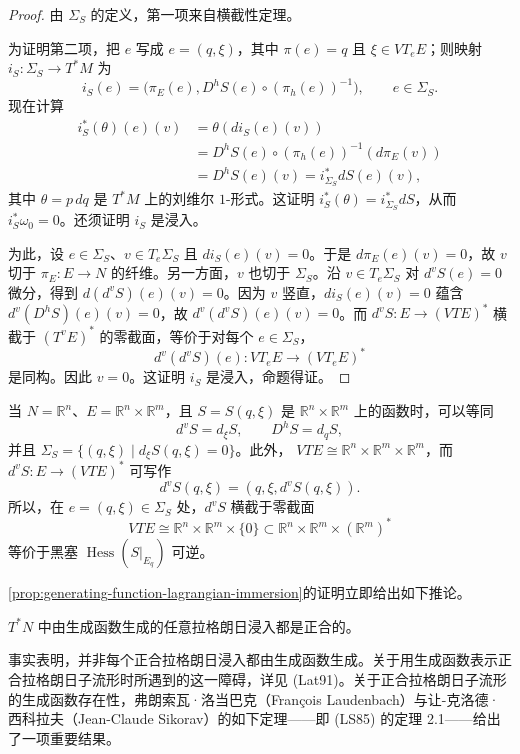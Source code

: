 \begin{proof}
由 $\Sigma_S$ 的定义，第一项来自横截性定理。

为证明第二项，把 $e$ 写成 $e=(q,\xi)$，其中 $\pi(e)=q$ 且
$\xi\in VT_eE$；则映射 $i_S:\Sigma_S\to T^*M$ 为
\[
 i_S(e)=\bigl(\pi_E(e),D^hS(e)\circ(\pi_h(e))^{-1}\bigr),
 \qquad e\in\Sigma_S.
\]
现在计算
\[
\begin{aligned}
 i_S^*(\theta)(e)(v)
 &=\theta(di_S(e)(v))\\
 &=D^hS(e)\circ(\pi_h(e))^{-1}(d\pi_E(v))\\
 &=D^hS(e)(v)=i_{\Sigma_S}^*dS(e)(v),
\end{aligned}
\]
其中 $\theta=p\,dq$ 是 $T^*M$ 上的刘维尔 $1$-形式。这证明
$i_S^*(\theta)=i_{\Sigma_S}^*dS$，从而 $i_S^*\omega_0=0$。还须证明 $i_S$ 是浸入。

为此，设 $e\in\Sigma_S$、$v\in T_e\Sigma_S$ 且 $di_S(e)(v)=0$。于是
$d\pi_E(e)(v)=0$，故 $v$ 切于 $\pi_E:E\to N$ 的纤维。另一方面，$v$ 也切于
$\Sigma_S$。沿 $v\in T_e\Sigma_S$ 对 $d^vS(e)=0$ 微分，得到
$d(d^vS)(e)(v)=0$。因为 $v$ 竖直，$di_S(e)(v)=0$ 蕴含
$d^v(D^hS)(e)(v)=0$，故 $d^v(d^vS)(e)(v)=0$。而
$d^vS:E\to(VTE)^*$ 横截于 $(T^vE)^*$ 的零截面，等价于对每个
$e\in\Sigma_S$，
\[
 d^v(d^vS)(e):VT_eE\longrightarrow(VT_eE)^*
\]
是同构。因此 $v=0$。这证明 $i_S$ 是浸入，命题得证。
\end{proof}

\begin{remark}\label{rem:generating-function-euclidean-case}
当 $N=\mathbb R^n$、$E=\mathbb R^n\times\mathbb R^m$，且
$S=S(q,\xi)$ 是 $\mathbb R^n\times\mathbb R^m$ 上的函数时，可以等同
\[
 d^vS=d_\xi S,\qquad D^hS=d_qS,
\]
并且
$\Sigma_S=\{(q,\xi)\mid d_\xi S(q,\xi)=0\}$。此外，
$VTE\cong\mathbb R^n\times\mathbb R^m\times\mathbb R^m$，而
$d^vS:E\to(VTE)^*$ 可写作
\[
 d^vS(q,\xi)=(q,\xi,d^vS(q,\xi)).
\]
所以，在 $e=(q,\xi)\in\Sigma_S$ 处，$d^vS$ 横截于零截面
\[
 VTE\cong\mathbb R^n\times\mathbb R^m\times\{0\}
 \subset\mathbb R^n\times\mathbb R^m\times(\mathbb R^m)^*
\]
等价于黑塞 $\operatorname{Hess}(S|_{E_q})$ 可逆。
\end{remark}

\cref{prop:generating-function-lagrangian-immersion}的证明立即给出如下推论。

\begin{corollary}\label{cor:generated-lagrangian-exact}
$T^*N$ 中由生成函数生成的任意拉格朗日浸入都是正合的。
\end{corollary}

事实表明，并非每个正合拉格朗日浸入都由生成函数生成。关于用生成函数表示正合拉格朗日子流形时所遇到的这一障碍，详见 (Lat91)。关于正合拉格朗日子流形的生成函数存在性，弗朗索瓦·洛当巴克（François Laudenbach）与让-克洛德·西科拉夫（Jean-Claude Sikorav）的如下定理——即 (LS85) 的定理 2.1——给出了一项重要结果。

